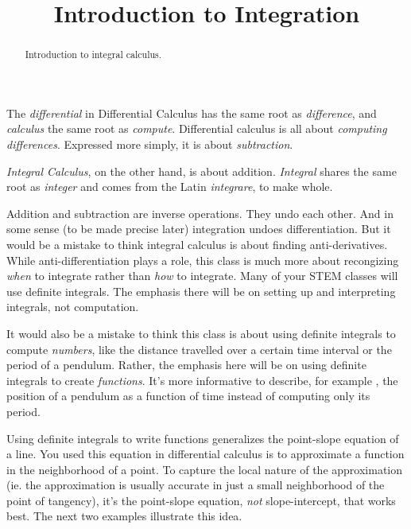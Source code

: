 \documentclass{ximera}
\title{Introduction to Integration}
\begin{document}
\begin{abstract}
Introduction to integral calculus.
\end{abstract}
\maketitle

The \emph{differential} in Differential Calculus has the same root as \emph{difference}, and \emph{calculus} the same root as \emph{compute}. Differential calculus is all about \emph{computing differences}. Expressed more simply, it is about \emph{subtraction}.


\emph{Integral Calculus}, on the other hand, is about addition. \emph{Integral} shares the same root as \emph{integer} and comes from the Latin \emph{integrare}, to make whole. 

Addition and subtraction are inverse operations. They undo each other. And in some sense (to be made precise later) integration
undoes differentiation. But it would be a mistake to think integral calculus is about finding anti-derivatives. While anti-differentiation plays a role, this class is much more about recongizing \emph{when} to integrate rather than \emph{how} to integrate. Many of your STEM classes will use definite integrals. The emphasis there will be on setting up and interpreting integrals, not computation. 

It would also be a mistake to think this class is about using definite integrals to compute \emph{numbers}, like the distance travelled over a certain time interval or the period of a pendulum. Rather, the emphasis here will be on using definite integrals to create \emph{functions}. It's more informative to describe, for example , the position of a pendulum as a function of time instead of computing only its period.

Using definite integrals to write functions generalizes the point-slope equation of a line. You used this equation in differential calculus is to approximate a function in the neighborhood of a point. To capture the local nature of the approximation (ie. the approximation is usually accurate in just a small neighborhood of the point of tangency), it's the point-slope equation, \emph{not} slope-intercept, that works best. The next two examples illustrate this idea.   %
\end{document}
